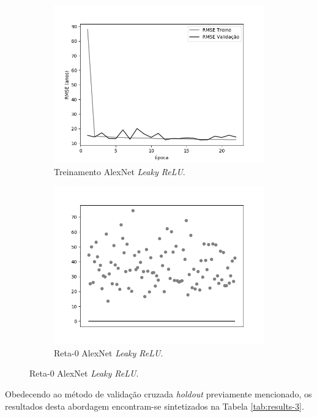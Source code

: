 \begin{figure}[hb!]
		\begin{subfigure}[hb]{0.5\linewidth}
			\caption{Treinamento AlexNet \emph{Leaky ReLU}.}
			\centering
			\includegraphics[width=\linewidth]{img/graficos/history/alexnet/fig-history-image-treat-3-alexnet-lrelu-rmse.png}
		\end{subfigure}
		\begin{subfigure}[hb]{0.5\linewidth}
			\caption{Reta-0 AlexNet \emph{Leaky ReLU}.}
			\includegraphics[width=\linewidth]{img/graficos/reta0/alexnet/fig-reta-0-image-treat-3-alexnet-lrelu.png}
		\end{subfigure}%
	\end{figure}

	Obedecendo ao método de validação cruzada \emph{holdout} previamente mencionado, os resultados desta abordagem encontram-se sintetizados na Tabela \ref{tab:results-3}.

